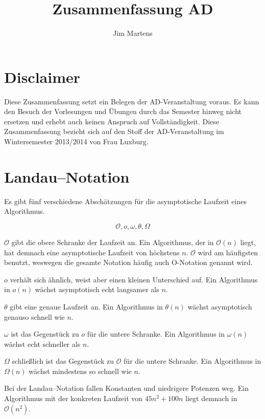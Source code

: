 \documentclass[10pt,a4paper,oneside,ngerman,numbers=noenddot]{scrartcl}
\begin{document}
\author{Jim Martens}
\title{Zusammenfassung AD}
\maketitle

\section*{Disclaimer}

	Diese Zusammenfassung setzt ein Belegen der AD-Veranstaltung voraus. Es kann den Besuch der Vorlesungen und Übungen durch das Semester hinweg nicht ersetzen und erhebt auch keinen Anspruch auf Vollständigkeit. Diese Zusammenfassung bezieht sich auf den Stoff der AD-Veranstaltung im Wintersemester 2013/2014 von Frau Luxburg.

\tableofcontents

\clearpage

\section{Landau--Notation}

	Es gibt fünf verschiedene Abschätzungen für die asymptotische Laufzeit eines Algorithmus.
	
	\[
		\mathcal{O}, o, \omega, \theta, \Omega
	\]
	
	$\mathcal{O}$ gibt die obere Schranke der Laufzeit an. Ein Algorithmus, der in $\mathcal{O}(n)$ liegt, hat demnach eine asymptotische Laufzeit von höchstens $n$. $\mathcal{O}$ wird am häufigsten benutzt, weswegen die gesamte Notation häufig auch O-Notation genannt wird.
	
	$o$ verhält sich ähnlich, weist aber einen kleinen Unterschied auf. Ein Algorithmus in $o(n)$ wächst asymptotisch echt langsamer als $n$.
	
	$\theta$ gibt eine genaue Laufzeit an. Ein Algorithmus in $\theta(n)$ wächst asymptotisch genauso schnell wie $n$.
	
	$\omega$ ist das Gegenstück zu $o$ für die untere Schranke. Ein Algorithmus in $\omega(n)$ wächst echt schneller als $n$.
	
	$\Omega$ schließlich ist das Gegenstück zu $\mathcal{O}$ für die untere Schranke. Ein Algorithmus in $\Omega(n)$ wächst mindestens so schnell wie $n$.
	
	Bei der Landau--Notation fallen Konstanten und niedrigere Potenzen weg. Ein Algorithmus mit der konkreten Laufzeit von $45n^{2} + 100n$ liegt demnach in $\mathcal{O}(n^{2})$.
	
\end{document}
